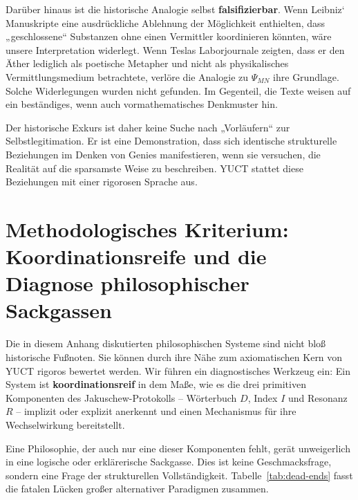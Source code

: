 \documentclass[12pt,a4paper]{article}
\begin{document}
	Darüber hinaus ist die historische Analogie selbst \textbf{falsifizierbar}. Wenn Leibniz‘ Manuskripte eine ausdrückliche Ablehnung der Möglichkeit enthielten, dass „geschlossene“ Substanzen ohne einen Vermittler koordinieren könnten, wäre unsere Interpretation widerlegt. Wenn Teslas Laborjournale zeigten, dass er den Äther lediglich als poetische Metapher und nicht als physikalisches Vermittlungsmedium betrachtete, verlöre die Analogie zu \(\Psi_{MN}\) ihre Grundlage. Solche Widerlegungen wurden nicht gefunden. Im Gegenteil, die Texte weisen auf ein beständiges, wenn auch vormathematisches Denkmuster hin.
	
	Der historische Exkurs ist daher keine Suche nach „Vorläufern“ zur Selbstlegitimation. Er ist eine Demonstration, dass sich identische strukturelle Beziehungen im Denken von Genies manifestieren, wenn sie versuchen, die Realität auf die sparsamste Weise zu beschreiben. YUCT stattet diese Beziehungen mit einer rigorosen Sprache aus.
	
	\section{Methodologisches Kriterium: Koordinationsreife und die Diagnose philosophischer Sackgassen}
	\label{sec:methodological-criterion}
	
	Die in diesem Anhang diskutierten philosophischen Systeme sind nicht bloß historische Fußnoten. Sie können durch ihre Nähe zum axiomatischen Kern von YUCT rigoros bewertet werden. Wir führen ein diagnostisches Werkzeug ein: Ein System ist \textbf{koordinationsreif} in dem Maße, wie es die drei primitiven Komponenten des Jakuschew-Protokolls – Wörterbuch \(D\), Index \(I\) und Resonanz \(R\) – implizit oder explizit anerkennt und einen Mechanismus für ihre Wechselwirkung bereitstellt.
	
	Eine Philosophie, der auch nur eine dieser Komponenten fehlt, gerät unweigerlich in eine logische oder erklärerische Sackgasse. Dies ist keine Geschmacksfrage, sondern eine Frage der strukturellen Vollständigkeit. Tabelle~\ref{tab:dead-ends} fasst die fatalen Lücken großer alternativer Paradigmen zusammen.
	
\end{document}
